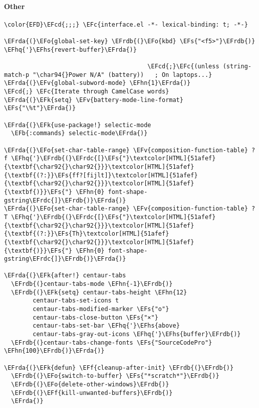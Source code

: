 \documentclass[a4wide,10pt]{article}
\newcommand{\EFc}[1]{\textcolor{EFc}{#1}} %
\newcommand{\EFcd}[1]{\textcolor{EFcd}{#1}} %
\newcommand{\EFs}[1]{\textcolor{EFs}{#1}} %
\newcommand{\EFk}[1]{\textcolor{EFk}{#1}} %
\newcommand{\EFb}[1]{\textcolor{EFb}{#1}} %
\newcommand{\EFf}[1]{\textcolor{EFf}{#1}} %
\newcommand{\EFv}[1]{\textcolor{EFv}{#1}} %
\newcommand{\EFo}[1]{\textcolor{EFo}{#1}} %
\newcommand{\EFhn}[1]{\textcolor{EFhn}{\textbf{#1}}} %
\newcommand{\EFhq}[1]{\textcolor{EFhq}{#1}} %
\newcommand{\EFhs}[1]{\textcolor{EFhs}{#1}} %
\newcommand{\EFrda}[1]{\textcolor{EFrda}{#1}} %
\newcommand{\EFrdb}[1]{\textcolor{EFrdb}{#1}} %
\newcommand{\EFrdc}[1]{\textcolor{EFrdc}{#1}} %
\begin{document}
\paragraph{Other}
\label{sec:org16582ac}
\begin{Code}
\begin{Verbatim}
\color{EFD}\EFcd{;;;} \EFc{interface.el -*- lexical-binding: t; -*-}

\EFrda{(}\EFo{global-set-key} \EFrdb{(}\EFo{kbd} \EFs{"<f5>"}\EFrdb{)} \EFhq{'}\EFhs{revert-buffer}\EFrda{)}

                                        \EFcd{;}\EFc{(unless (string-match-p "\char94{}Power N/A" (battery))   ; On laptops...}
\EFrda{(}\EFv{global-subword-mode} \EFhn{1}\EFrda{)}                           \EFcd{;} \EFc{Iterate through CamelCase words}
\EFrda{(}\EFk{setq} \EFv{battery-mode-line-format} \EFs{"\%t"}\EFrda{)}

\EFrda{(}\EFk{use-package!} selectic-mode
  \EFb{:commands} selectic-mode\EFrda{)}

\EFrda{(}\EFo{set-char-table-range} \EFv{composition-function-table} ?f \EFhq{'}\EFrdb{(}\EFrdc{[}\EFs{"}\textcolor[HTML]{51afef}{\textbf{\char92{}\char92{}}}\textcolor[HTML]{51afef}{\textbf{(?:}}\EFs{ff?[fijlt]}\textcolor[HTML]{51afef}{\textbf{\char92{}\char92{}}}\textcolor[HTML]{51afef}{\textbf{)}}\EFs{"} \EFhn{0} font-shape-gstring\EFrdc{]}\EFrdb{)}\EFrda{)}
\EFrda{(}\EFo{set-char-table-range} \EFv{composition-function-table} ?T \EFhq{'}\EFrdb{(}\EFrdc{[}\EFs{"}\textcolor[HTML]{51afef}{\textbf{\char92{}\char92{}}}\textcolor[HTML]{51afef}{\textbf{(?:}}\EFs{Th}\textcolor[HTML]{51afef}{\textbf{\char92{}\char92{}}}\textcolor[HTML]{51afef}{\textbf{)}}\EFs{"} \EFhn{0} font-shape-gstring\EFrdc{]}\EFrdb{)}\EFrda{)}

\EFrda{(}\EFk{after!} centaur-tabs
  \EFrdb{(}centaur-tabs-mode \EFhn{-1}\EFrdb{)}
  \EFrdb{(}\EFk{setq} centaur-tabs-height \EFhn{12}
        centaur-tabs-set-icons t
        centaur-tabs-modified-marker \EFs{"o"}
        centaur-tabs-close-button \EFs{"×"}
        centaur-tabs-set-bar \EFhq{'}\EFhs{above}
        centaur-tabs-gray-out-icons \EFhq{'}\EFhs{buffer}\EFrdb{)}
  \EFrdb{(}centaur-tabs-change-fonts \EFs{"SourceCodePro"} \EFhn{100}\EFrdb{)}\EFrda{)}

\EFrda{(}\EFk{defun} \EFf{cleanup-after-init} \EFrdb{(}\EFrdb{)}
  \EFrdb{(}\EFo{switch-to-buffer} \EFs{"*scratch*"}\EFrdb{)}
  \EFrdb{(}\EFo{delete-other-windows}\EFrdb{)}
  \EFrdb{(}\EFf{kill-unwanted-buffers}\EFrdb{)}
  \EFrda{)}


\end{Verbatim}
\end{Code}
\end{document}
